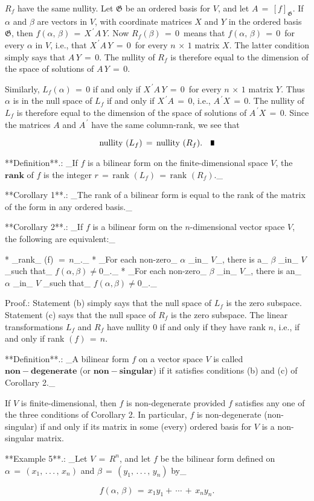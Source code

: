 \(R_{f}\) have the same nullity. Let \(\mathfrak{G}\) be an ordered basis for \(V\), and let \(A\,=\,[f]_{\mathfrak{G}}\). If \(\alpha\) and \(\beta\) are vectors in \(V\), with coordinate matrices \(X\) and \(Y\) in the ordered basis \(\mathfrak{G}\), then \(f(\alpha,\,\beta)\,=\,X^{\,\prime}A\,Y\). Now \(R_{f}(\beta)\,=\,0\,\) means that \(f(\alpha,\,\beta)\,=\,0\,\) for every \(\alpha\) in \(V\), i.e., that \(X^{\,\prime}A\,Y\,=\,0\,\) for every \(n\,\times\,1\) matrix \(X\). The latter condition simply says that \(A\,Y\,=\,0\). The nullity of \(R_{f}\) is therefore equal to the dimension of the space of solutions of \(A\,Y\,=\,0\).

Similarly, \(L_{f}(\alpha)\,=\,0\) if and only if \(X^{\,\prime}A\,Y\,=\,0\,\) for every \(n\,\times\,1\) matrix \(Y\). Thus \(\alpha\) is in the null space of \(L_{f}\) if and only if \(X^{\,\prime}A\,=\,0\), i.e., \(A^{\,\prime}X\,=\,0\). The nullity of \(L_{f}\) is therefore equal to the dimension of the space of solutions of \(A^{\,\prime}X\,=\,0\). Since the matrices \(A\) and \(A^{\,\prime}\) have the same column-rank, we see that

\[\text{nullity }(L_{f})\,=\,\text{nullity }(R_{f}).\quad\vrule height 6.0pt width 4.0pt depth 0.0pt\]

**Definition**.: _If \(f\) is a bilinear form on the finite-dimensional space \(V\), the \(\mathbf{rank}\) of \(f\) is the integer \(r\,=\,\text{rank }(L_{f})\,=\,\text{rank }(R_{f})\)._

**Corollary 1**.: _The rank of a bilinear form is equal to the rank of the matrix of the form in any ordered basis._

**Corollary 2**.: _If \(f\) is a bilinear form on the \(n\)-dimensional vector space \(V\), the following are equivalent:_

* _rank_ (f) \(=\,n\)_._
* _For each non-zero_ \(\alpha\) _in_ \(V\)_, there is a_ \(\beta\) _in_ \(V\) _such that_ \(f(\alpha,\beta)\neq 0\)_._
* _For each non-zero_ \(\beta\) _in_ \(V\)_, there is an_ \(\alpha\) _in_ \(V\) _such that_ \(f(\alpha,\beta)\neq 0\)_._

Proof.: Statement (b) simply says that the null space of \(L_{f}\) is the zero subspace. Statement (c) says that the null space of \(R_{f}\) is the zero subspace. The linear transformations \(L_{f}\) and \(R_{f}\) have nullity \(0\) if and only if they have rank \(n\), i.e., if and only if rank \((f)\,=\,n\). 

**Definition**.: _A bilinear form \(f\) on a vector space \(V\) is called \(\mathbf{non-degenerate}\) (or \(\mathbf{non-singular}\)) if it satisfies conditions (b) and (c) of Corollary 2._

If \(V\) is finite-dimensional, then \(f\) is non-degenerate provided \(f\) satisfies any one of the three conditions of Corollary 2. In particular, \(f\) is non-degenerate (non-singular) if and only if its matrix in some (every) ordered basis for \(V\) is a non-singular matrix.

**Example 5**.: _Let \(V\,=\,R^{n}\), and let \(f\) be the bilinear form defined on \(\alpha\,=\,(x_{1},\,.\,.\,.\,,\,x_{n})\) and \(\beta\,=\,(y_{1},\,.\,.\,.\,,\,y_{n})\) by_

\[f(\alpha,\,\beta)\,=\,x_{1}y_{1}+\,\cdots\,+\,x_{n}y_{n}.\] 